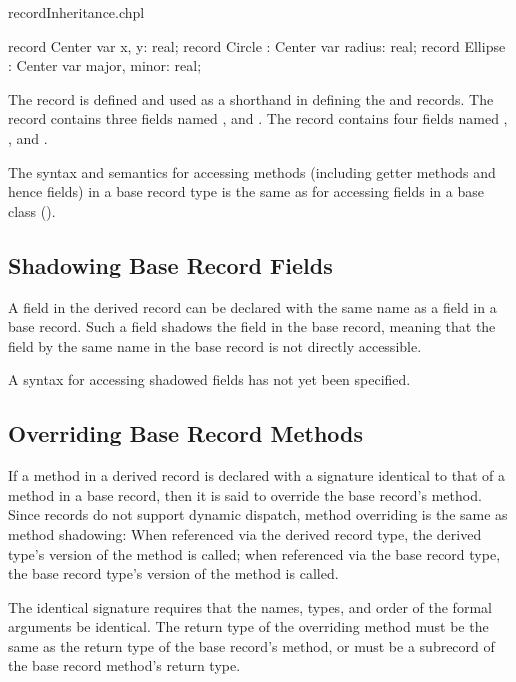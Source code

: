 \begin{chapelexample}{recordInheritance.chpl}
\begin{chapel}
record Center { var x, y: real; }
record Circle : Center {
  var radius: real;
}
record Ellipse : Center {
  var major, minor: real;
}
\end{chapel}
\begin{chapeloutput}
\end{chapeloutput}
The record  is defined and used as a shorthand in defining
the  and  records.  The  record contains
three  fields named ,  and .  The
 record contains four  fields named , ,
 and .
\end{chapelexample}

The syntax and semantics for accessing methods (including getter methods and
hence fields) in a base
record type is the same as for accessing fields in a base class ().

\subsection{Shadowing Base Record Fields}
\label{Shadowing_Base_Record_Fields}

A field in the derived record can be declared with the same name as a
field in a base record.  Such a field shadows the field in the base
record, meaning that the field by the same name in the base record is not
directly accessible.

\begin{openissue}
A syntax for accessing shadowed fields has not yet been specified.
\end{openissue}

\subsection{Overriding Base Record Methods}
\label{Overriding_Base_Record_Methods}

\begin{future}
If a method in a derived record is declared with a signature identical to that
of a method in a base record, then it is said to override the
base record's method.  Since records do not support dynamic dispatch, method
overriding is the same as method shadowing: When referenced via the derived
record type, the derived type's version of the method is called; when referenced
via the base record type, the base record type's version of the method is called.

The identical signature requires that the names, types, and order of
the formal arguments be identical. The return type of the overriding
method must be the same as the return type of the base record's method,
or must be a subrecord of the base record method's return type.
\end{future}

